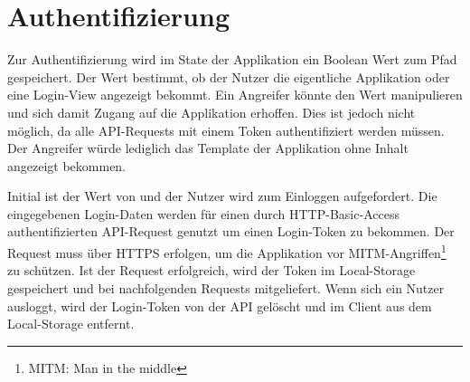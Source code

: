 \section{Authentifizierung}
\label{sec:f_authentifizierung}

Zur Authentifizierung wird im State der Applikation ein Boolean Wert zum
Pfad  gespeichert.  Der Wert bestimmt, ob der Nutzer
die eigentliche Applikation oder eine Login-View angezeigt bekommt.
Ein Angreifer könnte den Wert manipulieren und sich damit Zugang auf die
Applikation erhoffen.  Dies ist jedoch nicht möglich, da alle API-Requests mit
einem Token authentifiziert werden müssen.  Der Angreifer würde lediglich das
Template der Applikation ohne Inhalt angezeigt bekommen.

Initial ist der Wert von   und der Nutzer
wird zum Einloggen aufgefordert.  Die eingegebenen Login-Daten werden für einen
durch HTTP-Basic-Access~\cite{RFC2617} authentifizierten API-Request genutzt um
einen Login-Token zu bekommen.  Der Request muss über HTTPS erfolgen, um die
Applikation vor MITM-Angriffen\footnote{MITM: Man in the middle} zu schützen.
Ist der Request erfolgreich, wird der Token im Local-Storage~\cite{web-storage}
gespeichert und bei nachfolgenden Requests mitgeliefert.  Wenn sich ein Nutzer
ausloggt, wird der Login-Token von der API gelöscht und im Client aus dem
Local-Storage entfernt.
